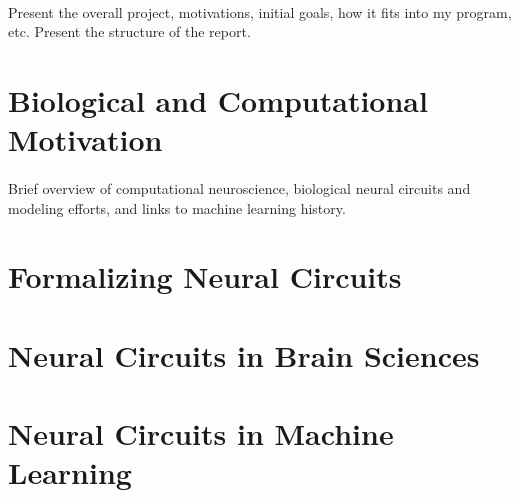 \documentclass{article}
\begin{document}
\paragraph{} Present the overall project, motivations, initial goals, how it fits into my program, etc. Present the structure of the report.

\section{Biological and Computational Motivation}

\paragraph{}Brief overview of computational neuroscience, biological neural circuits and modeling efforts, and links to machine learning history.

\section{Formalizing Neural Circuits}
\label{sec:neural_circuits}



\section{Neural Circuits in Brain Sciences}
\label{sec:neural_circuits_brain_science}



\section{Neural Circuits in Machine Learning}
\end{document}

